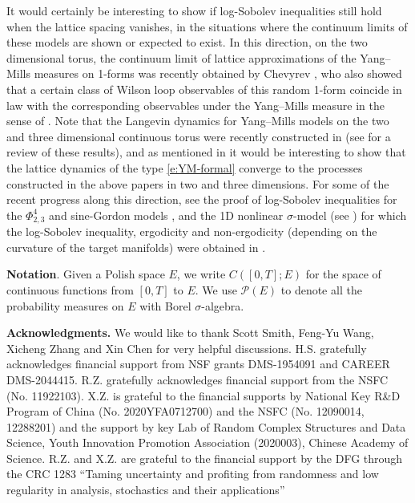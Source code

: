 \documentclass[11pt,UTF-8,reqno]{amsart}
\numberwithin{equation}{section}
\def\sP{{\mathscr P}}
\def\leq{\leqslant}
\def\leq{\leqslant}
\begin{document}
It would certainly be interesting to show if
log-Sobolev inequalities still hold when the lattice spacing vanishes,
in the situations where the continuum limits of these models are shown or expected to exist. In this direction, on the two dimensional torus, the continuum limit of lattice approximations of the Yang--Mills measures on 1-forms was recently obtained by Chevyrev \cite{Chevyrev19YM},
who  also showed that 
a certain class of Wilson loop observables of this random 1-form 
coincide in law with the corresponding observables under the Yang--Mills measure in the sense of  \cite{Levy03}.
 Note that the Langevin dynamics 
for Yang--Mills models on the two and three dimensional continuous torus were recently constructed in
\cite{CCHS2d,CCHS3d} (see \cite{ChevyrevReview} for a review of these results), and as mentioned in \cite{CCHS2d} it would be interesting to show that the  lattice dynamics of the type \eqref{e:YM-formal} converge
to the processes constructed in the above papers in two and three dimensions.
For some of the recent progress along this direction, 
see the proof of log-Sobolev inequalities for the $\Phi^4_{2,3}$ and sine-Gordon models \cite{RolandPhi4,RolandSG},
and the 1D nonlinear $\sigma$-model 
(see \cite{AnderssonDriver,Hairer16,StringManifold})
for which the log-Sobolev inequality, ergodicity and non-ergodicity (depending on the curvature of the target manifolds) were obtained in \cite{RWZZ17, CWZZ18}.


{\bf Notation}.
Given a Polish space $E$, we write $C([0,T];E)$ for the space of continuous functions from $[0,T]$ to $E$. We use $\sP(E)$ to denote all the probability measures on $E$ with Borel $\sigma$-algebra.



\noindent\textbf{Acknowledgments.}
We would like to thank Scott Smith, Feng-Yu Wang, Xicheng Zhang and Xin Chen
for very helpful discussions.
 H.S. gratefully acknowledges financial support from NSF grants
DMS-1954091 and CAREER DMS-2044415.
 R.Z. gratefully acknowledges financial support from the NSFC (No.
 11922103).  X.Z. is grateful to
the financial supports   by National Key R\&D Program of China (No. 2020YFA0712700) and  the NSFC (No.
12090014, 12288201)  and the support by key Lab of Random Complex Structures and Data Science, Youth Innovation Promotion Association (2020003), Chinese Academy of Science. R.Z. and X.Z. are grateful to the financial support by the DFG through the CRC 1283 ``Taming uncertainty
and profiting from randomness and low regularity in analysis, stochastics and their applications''
\end{document}
